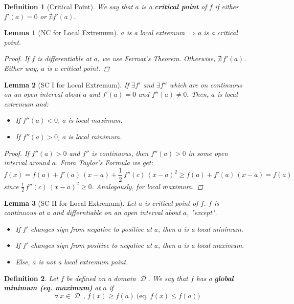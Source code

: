 \documentclass[12pt]{article}
\let\RA\Rightarrow
\newcommand{\Forall}[1]{\forall\,{#1}\,,\,}
\DeclareMathOperator{\D}{\mathcal{D}}
\newtheorem{definition}{Definition}[subsection]
\newtheorem{lemma}{Lemma}[subsection]
\begin{document}
\begin{definition}[Critical Point]
  We say that $a$ is a \textbf{critical point} of $f$ if either $f'(a)=0$ or $\nexists f'(a)$.
\end{definition}

\begin{lemma}[NC for Local Extremum]
  $a$ is a local extremum $\RA a$ is a critical point.
  \begin{proof}
    If $f$ is differentiable at $a$, we use Fermat's Theorem. Otherwise, $\nexists\,f'(a)$. Either way, $a$ is a critical point.
  \end{proof}
\end{lemma}

\begin{lemma}[SC I for Local Extremum]
  If $\exists f'$ and $\exists f''$ which are on continuous on an open interval about $a$ and $f'(a)=0$ and $f''(a)\neq 0$. Then, $a$ is local extremum and:
  \begin{itemize}
    \item If $f''(a)<0$, $a$ is local maximum.
    \item If $f''(a)>0$, $a$ is local minimum.
  \end{itemize}
  \begin{proof}
    If $f''(a)>0$ and $f''$ is continuous, then $f''(a)>0$ in some open interval around $a$. From Taylor's Formula we get: $$f(x)=f(a)+f'(a)\,(x-a)+\frac{1}{2}\,f''(c)\,(x-a)^2\geq f(a)+f'(a)\,(x-a)= f(a)$$
    since $\frac{1}{2}\,f''(c)\,(x-a)^2\geq 0$. Analogously, for local maximum.
  \end{proof}
\end{lemma}

\begin{lemma}[SC II for Local Extremum]
  Let $a$ is critical point of $f$. $f$ is continuous at $a$ and differntiable on an open interval about $a$, "except".
  \begin{itemize}
    \item If $f'$ changes sign from negative to positive at $a$, then $a$ is a local minimum.
    \item If $f'$ changes sign from positive to negative at $a$, then $a$ is a local maximum.
    \item Else, $a$ is not a local extremum point.
  \end{itemize}
\end{lemma}

\begin{definition}
  Let $f$ be defined on a domain $\D$. We say that $f$ has a \textbf{global minimum (eq. maximum)} at $a$ if $$\Forall{x\in\D} f(x)\geq f(a)\;\Big(\text{eq. }f(x)\leq f(a)\Big)$$
\end{definition}
\end{document}
